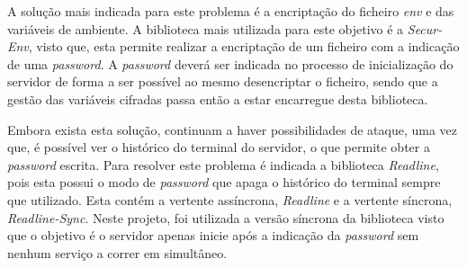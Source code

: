 A solução mais indicada para este problema é a encriptação do ficheiro \textit{env} e das variáveis de ambiente. A biblioteca mais utilizada para este objetivo é a \textit{Secur-Env}, visto que, esta permite realizar a encriptação de um ficheiro com a indicação de uma \textit{password}. A \textit{password} deverá ser indicada no processo de inicialização do servidor de forma a ser possível ao mesmo desencriptar o ficheiro, sendo que a gestão das variáveis cifradas passa então a estar encarregue desta biblioteca.

Embora exista esta solução, continuam a haver possibilidades de ataque, uma vez que, é possível ver o histórico do terminal do servidor, o que permite obter a \textit{password} escrita. Para resolver este problema é indicada a biblioteca \textit{Readline}, pois esta possui o modo de \textit{password} que apaga o histórico do terminal sempre que utilizado. Esta contém a vertente assíncrona, \textit{Readline} e a vertente síncrona, \textit{Readline-Sync}. Neste projeto, foi utilizada a versão síncrona da biblioteca visto que o objetivo é o servidor apenas inicie após a indicação da \textit{password} sem nenhum serviço a correr em simultâneo.
